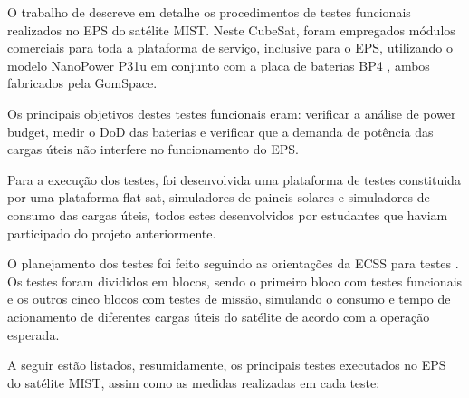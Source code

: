 O trabalho de \textcite{mist-eps} descreve em detalhe os procedimentos de testes funcionais realizados no \gls{EPS} do satélite MIST.
Neste CubeSat, foram empregados módulos comerciais para toda a plataforma de serviço, inclusive para o \gls{EPS}, utilizando o modelo NanoPower P31u \cite{p31u-datasheet} em conjunto com a placa de baterias BP4 \cite{bp4-datasheet}, ambos fabricados pela GomSpace.

Os principais objetivos destes testes funcionais eram: verificar a análise de power budget, medir o \gls{DoD} das baterias e verificar que a demanda de potência das cargas úteis não interfere no funcionamento do \gls{EPS}.

Para a execução dos testes, foi desenvolvida uma plataforma de testes constituida por uma plataforma flat-sat, simuladores de paineis solares e simuladores de consumo das cargas úteis, todos estes desenvolvidos por estudantes que haviam participado do projeto anteriormente.

O planejamento dos testes foi feito seguindo as orientações da \gls{ECSS} para testes \cite{ecss-e-st-10-03}.
Os testes foram divididos em blocos, sendo o primeiro bloco com testes funcionais e os outros cinco blocos com testes de missão, simulando o consumo e tempo de acionamento de diferentes cargas úteis do satélite de acordo com a operação esperada.

A seguir estão listados, resumidamente, os principais testes executados no \gls{EPS} do satélite MIST, assim como as medidas realizadas em cada teste:

